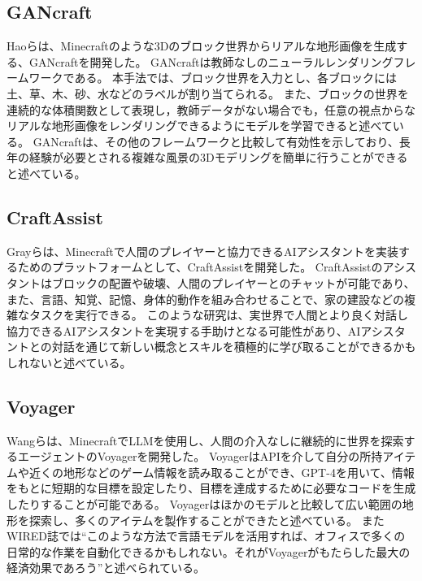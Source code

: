 \subsection{GANcraft}\label{sec:gancraft}
Haoらは、Minecraftのような3Dのブロック世界からリアルな地形画像を生成する、GANcraftを開発した。
GANcraftは教師なしのニューラルレンダリングフレームワークである。
本手法では、ブロック世界を入力とし、各ブロックには土、草、木、砂、水などのラベルが割り当てられる。
また、ブロックの世界を連続的な体積関数として表現し，教師データがない場合でも，任意の視点からなリアルな地形画像をレンダリングできるようにモデルを学習できると述べている。
GANcraftは、その他のフレームワークと比較して有効性を示しており、長年の経験が必要とされる複雑な風景の3Dモデリングを簡単に行うことができると述べている。

\subsection{CraftAssist}
Grayらは、Minecraftで人間のプレイヤーと協力できるAIアシスタントを実装するためのプラットフォームとして、CraftAssistを開発した。
CraftAssistのアシスタントはブロックの配置や破壊、人間のプレイヤーとのチャットが可能であり、また、言語、知覚、記憶、身体的動作を組み合わせることで、家の建設などの複雑なタスクを実行できる。
このような研究は、実世界で人間とより良く対話し協力できるAIアシスタントを実現する手助けとなる可能性があり、AIアシスタントとの対話を通じて新しい概念とスキルを積極的に学び取ることができるかもしれないと述べている。

\subsection{Voyager}
Wangらは、MinecraftでLLMを使用し、人間の介入なしに継続的に世界を探索するエージェントのVoyagerを開発した。
VoyagerはAPIを介して自分の所持アイテムや近くの地形などのゲーム情報を読み取ることができ、GPT-4を用いて、情報をもとに短期的な目標を設定したり、目標を達成するために必要なコードを生成したりすることが可能である。
Voyagerはほかのモデルと比較して広い範囲の地形を探索し、多くのアイテムを製作することができたと述べている。
またWIRED誌では``このような方法で言語モデルを活用すれば、オフィスで多くの日常的な作業を自動化できるかもしれない。それがVoyagerがもたらした最大の経済効果であろう''と述べられている。
